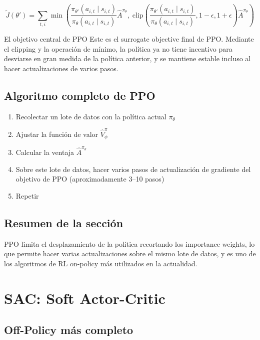 \documentclass[a4paper]{article}
\begin{document}
$$\tilde{J}(\theta') = \sum_{t,i} \min\left(\frac{\pi_{\theta'}(a_{i,t} \mid s_{i,t})}{\pi_\theta(a_{i,t} \mid s_{i,t})} \hat{A}^{\pi_\theta}, \; \mathrm{clip}\left(\frac{\pi_{\theta'}(a_{i,t} \mid s_{i,t})}{\pi_\theta(a_{i,t} \mid s_{i,t})}, 1-\epsilon, 1+\epsilon\right) \hat{A}^{\pi_\theta}\right)$$

\begin{importantbox}{El objetivo central de PPO}
Este es el surrogate objective final de PPO. Mediante el clipping y la operación de mínimo, la política ya no tiene incentivo para desviarse en gran medida de la política anterior, y se mantiene estable incluso al hacer actualizaciones de varios pasos.
\end{importantbox}

\subsection{Algoritmo completo de PPO}

\begin{enumerate}
    \item Recolectar un lote de datos con la política actual $\pi_\theta$
    \item Ajustar la función de valor $\hat{V}^\pi_\phi$
    \item Calcular la ventaja $\hat{A}^{\pi_\theta}$
    \item Sobre este lote de datos, hacer varios pasos de actualización de gradiente del objetivo de PPO (aproximadamente 3--10 pasos)
    \item Repetir
\end{enumerate}

\subsection{Resumen de la sección}

PPO limita el desplazamiento de la política recortando los importance weights, lo que permite hacer varias actualizaciones sobre el mismo lote de datos, y es uno de los algoritmos de RL on-policy más utilizados en la actualidad.

\section{SAC: Soft Actor-Critic}

\subsection{Off-Policy más completo}
\end{document}
